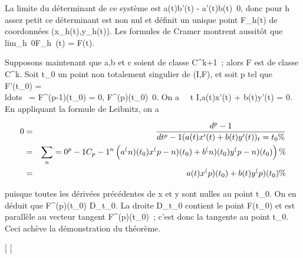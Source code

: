 \documentclass[]{article}
\begin{document}
La limite du déterminant de ce système est a(t)b'(t) -
a'(t)b(t)\neq~0, donc pour h assez petit ce
déterminant est non nul et définit un unique point F_h(t) de
coordonnées (x_h(t),y_h(t)). Les formules de Cramer
montrent aussitôt que
lim_h\rightarrow~0F_h~(t) = F(t).

Supposons maintenant que a,b et c soient de classe C^k+1~;
alors F est de classe C^k. Soit t_0 un point non
totalement singulier de (I,F), et soit p tel que F'(t_0) =
\\ldots~ =
F^(p-1)(t_0) = 0,
F^(p)(t_0)\neq~0. On a
\forall~~t \in I,a(t)x'(t) + b(t)y'(t) = 0. En
appliquant la formule de Leibnitz, on a

\begin{align*} 0& =& d^p-1
\over dt^p-1 (a(t)x'(t) +
b(t)y'(t))_t=t_0 \%& \\
& =& \sum _n=0^p-1C_
p-1^n\left (a^(n)(t_
0)x^(p-n)(t_ 0) + b^(n)(t_
0)y^(p-n)(t_ 0)\right )\%&
\\ & =& a(t)x^(p)(t_
0) + b(t)y^(p)(t_ 0) \%&
\\ \end{align*}

puisque toutes les dérivées précédentes de x et y sont nulles au point
t_0. On en déduit que F^(p)(t_0)
\in\overrightarrow D_t_0. La droite
D_t_0 contient le point F(t_0) et est
parallèle au vecteur tangent F^(p)(t_0)~; c'est donc
la tangente au point t_0. Ceci achève la démonstration du
théorème.

[
[
\end{document}
